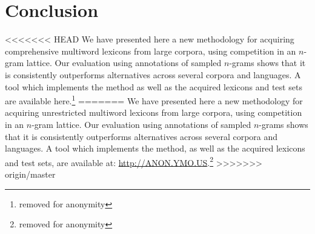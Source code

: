 \documentclass[11pt,letterpaper]{article}
\begin{document}
\section{Conclusion}

<<<<<<< HEAD
We have presented here a new methodology for acquiring comprehensive multiword lexicons from large corpora, using competition in an $n$-gram lattice. Our evaluation using annotations of sampled $n$-grams shows that it is consistently outperforms alternatives across several corpora and languages. A tool which implements the method as well as the acquired lexicons and test sets are available here.\footnote{removed for anonymity} 
=======
We have presented here a new methodology for acquiring unrestricted multiword lexicons from large corpora, using competition in an $n$-gram lattice. Our evaluation using annotations of sampled $n$-grams shows that it is consistently outperforms alternatives across several corpora and languages. A tool which implements the method, as well as the acquired lexicons and test sets, are available at: \url{http://ANON.YMO.US}.\footnote{removed for anonymity} 
>>>>>>> origin/master




\end{document}
